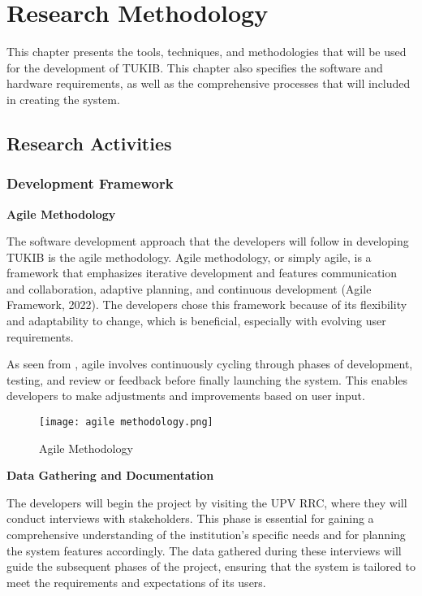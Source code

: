 \chapter{Research Methodology}
This chapter presents the tools, techniques, and methodologies that will be used for the development of TUKIB. This chapter also specifies the software and hardware requirements, as well as the comprehensive processes that will included in creating the system.

\section{Research Activities}

\subsection{Development Framework}

\textbf{Agile Methodology}

\noindent The software development approach that the developers will follow in developing TUKIB is the agile methodology. Agile methodology, or simply agile, is a framework that emphasizes iterative development and features communication and collaboration, adaptive planning, and continuous development (Agile Framework, 2022). The developers chose this framework because of its flexibility and adaptability to change, which is beneficial, especially with evolving user requirements. 

As seen from , agile involves continuously cycling through phases of development, testing, and review or feedback before finally launching the system. This enables developers to make adjustments and improvements based on user input. \newline

\begin{figure}[h]
	\centering 
	\texttt{[image: agile methodology.png]}
	\caption{Agile Methodology}
	\label{fig:agile}
\end{figure}

\noindent\textbf{Data Gathering and Documentation}
	
\noindent The developers will begin the project by visiting the UPV RRC, where they will conduct interviews with stakeholders. This phase is essential for gaining a comprehensive understanding of the institution's specific needs and for planning the system features accordingly. The data gathered during these interviews will guide the subsequent phases of the project, ensuring that the system is tailored to meet the requirements and expectations of its users. 

